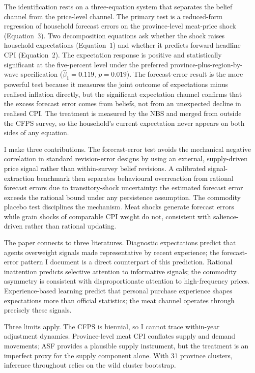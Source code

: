 The identification rests on a three-equation system that
separates the belief channel from the price-level channel.
The primary test is a reduced-form regression of household
forecast errors on the province-level meat-price shock
(Equation~3).
Two decomposition equations ask whether the shock raises
household expectations (Equation~1) and whether it predicts
forward headline CPI (Equation~2).
The expectation response is positive and statistically
significant at the five-percent level under the preferred
province-plus-region-by-wave specification
($\hat{\beta}_1 = 0.119$, $p = 0.019$).
The forecast-error result is the more powerful test because it
measures the joint outcome of expectations minus realised
inflation directly, but the significant expectation channel
confirms that the excess forecast error comes from beliefs,
not from an unexpected decline in realised CPI.
The treatment is measured by the NBS and merged from outside
the CFPS survey, so the household's current expectation never
appears on both sides of any equation.

I make three contributions.
The forecast-error test avoids the mechanical negative
correlation in standard revision-error designs by using an
external, supply-driven price signal rather than
within-survey belief revisions.
A calibrated signal-extraction benchmark then separates
behavioural overreaction from rational forecast errors due to
transitory-shock uncertainty: the estimated forecast error
exceeds the rational bound under any persistence assumption.
The commodity placebo test disciplines the mechanism.
Meat shocks generate forecast errors while grain shocks of
comparable CPI weight do not, consistent with salience-driven
rather than rational updating.

The paper connects to three literatures.
Diagnostic expectations \citep{Bordalo2018, Bordalo2020b}
predict that agents overweight signals made representative
by recent experience; the forecast-error pattern I document
is a direct counterpart of this prediction.
Rational inattention \citep{Sims2003, Mackowiak2009} predicts
selective attention to informative signals; the commodity
asymmetry is consistent with disproportionate attention to
high-frequency prices.
Experience-based learning
\citep{Malmendier2016, Kuchler2019} predict that personal
purchase experience shapes expectations more than official
statistics; the meat channel operates through precisely
these signals.

Three limits apply.
The CFPS is biennial, so I cannot trace within-year adjustment
dynamics.
Province-level meat CPI conflates supply and demand movements;
ASF provides a plausible supply instrument, but the treatment
is an imperfect proxy for the supply component alone.
With 31 province clusters, inference throughout relies on
the wild cluster bootstrap.

